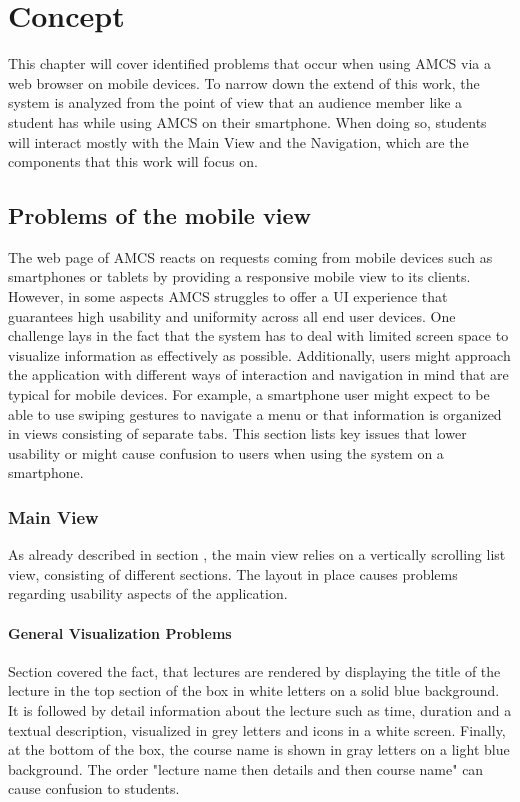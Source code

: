 \chapter{Concept}
This chapter will cover identified problems that occur when using AMCS via a web browser on mobile
devices. To narrow down the extend of this work, the system is analyzed from the point of view that an audience member like a student has while using AMCS on their smartphone. When doing so, students will interact mostly with the Main View and the Navigation, which are the components that this work will focus on.

\section{Problems of the mobile view}

The web page of AMCS reacts on requests coming from mobile devices such as smartphones or tablets by providing a responsive mobile view to its clients. However, in some aspects AMCS struggles to offer a UI experience that guarantees high usability and uniformity across all end user devices.
One challenge lays in the fact that the system has to deal with limited screen space to visualize information as effectively as possible. Additionally, users might approach the application with different ways of interaction and navigation in mind that are typical for mobile devices. For example, a smartphone user might expect to be able to use swiping gestures to navigate a menu or that information is organized in views consisting of separate tabs. This section lists key issues that lower usability or might cause confusion to users when using the system on a smartphone.

\subsection{Main View}
As already described in section \todosct, the main view relies on a vertically scrolling list view, consisting of different sections. The layout in place causes problems regarding usability aspects of the application.

\subsubsection{General Visualization Problems}
\label{section:con:problems:mainview:generalvis}
Section \todosct covered the fact, that lectures are rendered by displaying the title of the lecture in the top section of the box in white letters on a solid blue background. It is followed by detail information about the lecture such as time, duration and a textual description, visualized in grey letters and icons in a white screen. Finally, at the bottom of the box, the course name is shown in gray letters on a light blue background. The order "lecture name then details and then course name" can cause confusion to students.

